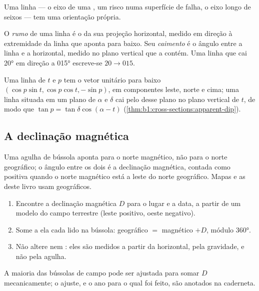 Uma linha --- o eixo de uma , um risco numa superfície de falha, o eixo longo de seixos --- tem uma orientação própria.

\begin{definition}\label{def:b1:field-lab-methods-1:trend-plunge}
O \emph{rumo} de uma linha é o  da sua projeção horizontal, medido em direção à extremidade da linha que aponta para baixo. Seu \emph{caimento} é o ângulo entre a linha e a horizontal, medido no plano vertical que a contém. Uma linha que cai \ang{20} em direção a \ang{015} escreve-se $20\to015$.
\end{definition}

Uma linha de  $t$ e  $p$ tem o vetor unitário para baixo $(\cos p\sin t, \cos p\cos t, -\sin p)$, em componentes leste, norte e cima; uma linha situada em um plano de  $\alpha$ e  $\delta$ cai pelo  desse plano no plano vertical de  $t$, de modo que $\tan p = \tan\delta\cos(\alpha - t)$ (\cref{thm:b1:cross-sections:apparent-dip}).

\subsection{A declinação magnética}

Uma agulha de bússola aponta para o norte magnético, não para o norte geográfico; o ângulo entre os dois é a declinação magnética, contada como positiva quando o norte magnético está a leste do norte geográfico. Mapas e as  deste livro usam  geográficos.

\begin{method}\label{met:b1:field-lab-methods-1:declination}
\begin{enumerate}
  \item Encontre a declinação magnética $D$ para o lugar e a data, a partir de um modelo do campo terrestre (leste positivo, oeste negativo).
  \item Some a ela cada  lido na bússola:  geográfico $=$  magnético $+ D$, módulo \ang{360}.
  \item Não altere  nem : eles são medidos a partir da horizontal, pela gravidade, e não pela agulha.
\end{enumerate}
A maioria das bússolas de campo pode ser ajustada para somar $D$ mecanicamente; o ajuste, e o ano para o qual foi feito, são anotados na caderneta.
\end{method}

